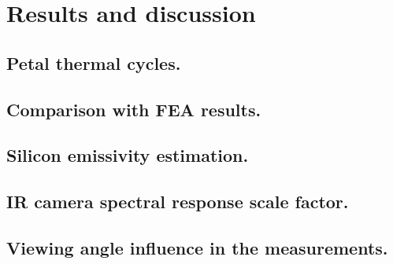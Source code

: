 \pagestyle{standard}

\chapter{Results and discussion}\label{chapter4}

	\thispagestyle{chapter-first-page}

	\section{Petal thermal cycles.}\label{section4.1}
	
	\section{Comparison with FEA results.}\label{section4.2}
	
	\section{Silicon emissivity estimation.}\label{section4.3}
	
	\section{IR camera spectral response scale factor.}\label{section4.4}
	
	\section{Viewing angle influence in the measurements.}\label{section4.5}
	
	